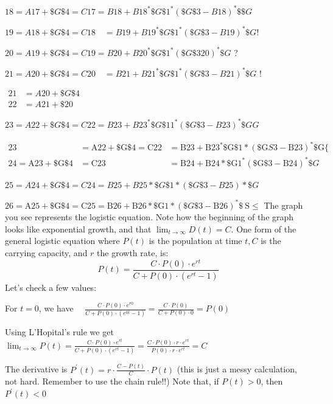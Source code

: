 \documentclass[10pt]{article}
\begin{document}
$18=A 17+\$ G \$ 4=C 17=B 18+B 18^{*} \$ G \$ 1^{*}(\$ G \$ 3-B 18)^{*} \$ \$ G$

$19=A 18+\$ G \$ 4=C 18 \quad=B 19+B 19^{*} \$ G \$ 1^{*}(\$ G \$ 3-B 19)^{*} \$ G !$

$20=A 19+\$ G \$ 4=C 19=B 20+B 20^{*} \$ G \$ 1^{*}(\$ G \$ 320)^{*} \$ G$ ?

$21=A 20+\$ G \$ 4=C 20 \quad=B 21+B 21^{*} \$ G \$ 1^{*}(\$ G \$ 3-B 21)^{*} \$ G$ !

$\begin{array}{ll}21 & =A 20+\$ G \$ 4 \\ 22 & =A 21+\$ 20\end{array}$

$23=A 22+\$ G \$ 4=C 22=B 23+B 23^{*} \$ G \$ 11^{*}(\$ G \$ 3-B 23)^{*} \$ G G$

$\begin{array}{lll}23 & =\mathrm{A} 22+\$ \mathrm{G} \$ 4=\mathrm{C} 22 & =\mathrm{B} 23+\mathrm{B} 23^{*} \$ \mathrm{G} \$ 1 *(\$ \mathrm{G} S 3-\mathrm{B} 23)^{*} \$ \mathrm{G}\{ \\ 24=\mathrm{A} 23+\$ \mathrm{G} \$ 4 & =\mathrm{C} 23 & =\mathrm{B} 24+\mathrm{B} 24 * \$ \mathrm{G} 1^{*}(\$ \mathrm{G} \$ 3-\mathrm{B} 24)^{*} \$ G\end{array}$

$25=A 24+\$ G \$ 4=C 24=B 25+B 25 * \$ G \$ 1 *(\$ G \$ 3-B 25) * \$ G$

$26=\mathrm{A} 25+\$ \mathrm{G} \$ 4=\mathrm{C} 25=\mathrm{B} 26+\mathrm{B} 26 * \$ \mathrm{G} 1 *(\$ G \$ 3-\mathrm{B} 26)^{*} \$ \mathrm{~S} \leqslant$ The graph you see represents the logistic equation. Note how the beginning of the graph looks like exponential growth, and that $\lim _{t \rightarrow \infty} D(t)=C$. One form of the general logistic equation where $P(t)$ is the population at time $t, C$ is the carrying capacity, and $r$ the growth rate, is:
$$
P(t)=\frac{C \cdot P(0) \cdot e^{r t}}{C+P(0) \cdot\left(e^{r t}-1\right)}
$$
Let's check a few values:

For $t=0$, we have $\quad \frac{C \cdot P(0) \cdot e^{r 0}}{C+P(0) \cdot\left(e^{0 t}-1\right)}=\frac{C \cdot P(0)}{C+P(0) \cdot 0}=P(0)$

Using L'Hopital's rule we get $\lim _{t \rightarrow \infty} P(t)=\frac{C \cdot P(0) \cdot e^{r t}}{C+P(0) \cdot\left(e^{r t}-1\right)}=\frac{C \cdot P(0) \cdot r \cdot e^{r t}}{P(0) \cdot r \cdot e^{r t}}=C$

The derivative is $P^{\prime}(t)=r \cdot \frac{C-P(t)}{C} \cdot P(t)$ (this is just a messy calculation, not hard. Remember to use the chain rule!!) Note that, if $P(t)>0$, then $P^{\prime}(t)<0$
\end{document}
